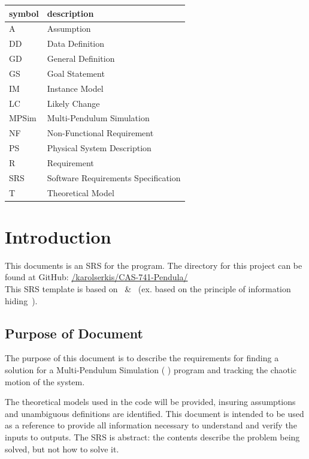 \documentclass[12pt]{article}
\begin{document}
\renewcommand{\arraystretch}{1.2}
\begin{tabular}{l l} 
  \toprule		
  \textbf{symbol} & \textbf{description}\\
  \midrule 
  A & Assumption\\
  DD & Data Definition\\
  GD & General Definition\\
  GS & Goal Statement\\
  IM & Instance Model\\
  LC & Likely Change\\
  MPSim & Multi-Pendulum Simulation\\
  NF & Non-Functional Requirement\\
  PS & Physical System Description\\
  R & Requirement\\
  SRS & Software Requirements Specification\\
  T & Theoretical Model\\
  \bottomrule
\end{tabular}

\newpage


\setcounter{secnumdepth}{3}

\section{Introduction}

This documents is an SRS for the \progname program. The
directory for this project can be found at GitHub:
\href{https://github.com/karolserkis/CAS-741-Pendula/}
{/karolserkis/CAS-741-Pendula/}\\
This SRS template is based on~\citep{SmithAndLai2005} \&~\citep{SmithEtAl2007}
(ex. based on the principle of information hiding~\citep{Parnas1972a}).

\subsection{Purpose of Document}
The purpose of this document is to describe the requirements for finding a 
solution for a Multi-Pendulum Simulation ( \progname) program and tracking the 
chaotic motion of the system. 

The theoretical models used in the \progname code will be provided, insuring
assumptions and unambiguous definitions are identified. This document 
is intended to be used as a reference to provide all information necessary to 
understand and verify the inputs to outputs. The SRS is abstract: the contents 
describe the problem being solved, but not how to solve it.
\end{document}
